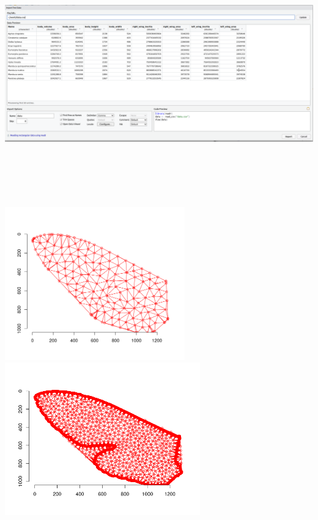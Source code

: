 \documentclass[
]{article}
\let\origfigure\figure
\let\endorigfigure\endfigure
\renewenvironment{figure}[1][2] {
    \expandafter\origfigure\expandafter[H]
} {
    \endorigfigure
}
\begin{document}
\begin{figure}
\centering
\includegraphics[width=\textwidth,height=4.16667in]{./img/data.png}
\caption{At the moment, the results of the calculations look like this}
\end{figure}

\includegraphics[width=\textwidth,height=2.60417in]{./img/convex_triangles.png}
\includegraphics[width=\textwidth,height=2.60417in]{./img/edge_triangles.png}
\end{document}
